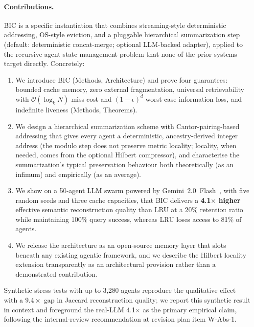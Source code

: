 \documentclass[fleqn,10pt]{article}
\theoremstyle{definition}
\newcommand{\Oh}{\mathcal{O}}
\begin{document}
\paragraph{Contributions.}
BIC is a specific instantiation that combines streaming-style
deterministic addressing, OS-style eviction, and a pluggable
hierarchical summarization step (default: deterministic concat-merge;
optional LLM-backed adapter), applied to the recursive-agent
state-management problem that none of the prior systems target
directly. Concretely:
\begin{enumerate}
  \item[(i)] We introduce BIC (Methods, Architecture) and prove
    four guarantees: bounded cache memory, zero external
    fragmentation, universal retrievability with
    $\Oh(\log_k N)$ miss cost and $(1-\epsilon)^d$ worst-case
    information loss, and indefinite liveness (Methods, Theorems).
  \item[(ii)] We design a hierarchical summarization scheme with
    Cantor-pairing-based addressing that gives every agent a
    deterministic, ancestry-derived integer address (the modulo step
    does not preserve metric locality; locality, when needed, comes
    from the optional Hilbert compressor), and characterise the
    summarization's typical preservation behaviour both theoretically
    (as an infimum) and empirically (as an average).
  \item[(iii)] We show on a 50-agent LLM swarm powered by
    Gemini~2.0~Flash~\citep{team2024gemini}, with five random seeds
    and three cache capacities, that BIC delivers a
    \textbf{4.1$\times$ higher} effective semantic reconstruction
    quality than LRU at a 20\% retention ratio while maintaining
    100\% query success, whereas LRU loses access to 81\% of agents.
  \item[(iv)] We release the architecture as an open-source memory
    layer that slots beneath any existing agentic framework, and
    we describe the Hilbert locality extension transparently as an
    architectural provision rather than a demonstrated contribution.
\end{enumerate}
Synthetic stress tests with up to 3,280 agents reproduce the
qualitative effect with a $9.4\times$ gap in Jaccard reconstruction
quality; we report this synthetic result in context and foreground
the real-LLM 4.1$\times$ as the primary empirical claim, following
the internal-review recommendation at revision plan item W-Abs-1.

\end{document}
